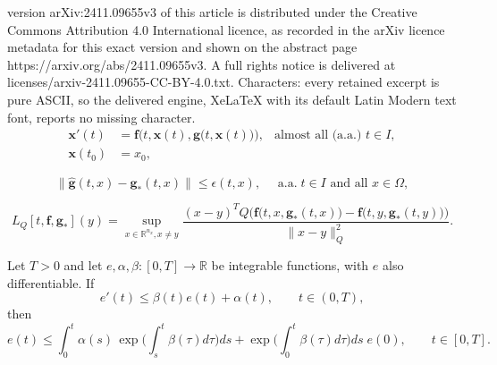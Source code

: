 \documentclass[10pt,a4paper]{amsart}
\newcommand {\real} {\mathbb{R}}
\newcommand{\aall}{\mbox{ a.a.} \;}
\newcommand{\bff}{\ensuremath{\mathbf{f}}} %
\newcommand{\bg}{\ensuremath{\mathbf{g}}} %
\newcommand{\bx}{\ensuremath{\mathbf{x}}} %
\begin{document}
version arXiv:2411.09655v3 of this article is distributed under the Creative Commons Attribution 4.0 International licence, as recorded in the arXiv licence metadata for this exact version and shown on the abstract page https://arxiv.org/abs/2411.09655v3. A full rights notice is delivered at licenses/arxiv-2411.09655-CC-BY-4.0.txt. Characters: every retained excerpt is pure ASCII, so the delivered engine, XeLaTeX with its default Latin Modern text font, reports no missing character.
\begin{equation} \label{eq:IVP}
\begin{aligned}
	\bx'(t) &= \bff\Big( t, \bx(t), \bg\big(t, \bx(t) \big) \Big), & \mbox{almost all (a.a.) } t \in I, \\
	\bx(t_0) &= x_0,
\end{aligned}
\end{equation}

\begin{equation}    \label{eq:g-error}
	\| \widehat{\bg}(t, x) - \bg_*(t, x) \| \leq  \epsilon(t, x), \quad \aall t \in I \mbox{ and all } x \in \Omega,
\end{equation}

\begin{equation}    \label{eq:logarithmic-norm-local}
       L_Q[t,\bff,\bg_*](y) 
       =   \sup_{x \in \real^{n_x}, x \not= y} \frac{ ( x - y )^T Q \Big( \bff\big(t, x, \bg _*(t,x)\big) - \bff\big(t, y, \bg _*(t,y)\big) \Big) }{ \| x - y \|_Q^2 }.
\end{equation}

\begin{lemma}   \label{lem:comparison}
  Let $T > 0$ and let $e, \alpha, \beta: [0, T] \rightarrow \real$ be integrable functions, with $e$ also differentiable.
  If
  \[
        e'(t) \le \beta(t) e(t) + \alpha(t), \qquad  t \in (0,T),
  \]
  then
  \[
         e(t)  \le \int_0^t  \alpha(s) \, \exp\big( \int_s^t  \beta(\tau)  d\tau \big) ds  +   \exp\big( \int_0^t  \beta(\tau)  d\tau \big) ds  \; e(0), \qquad t \in [0, T].
  \]
\end{lemma}
\end{document}
